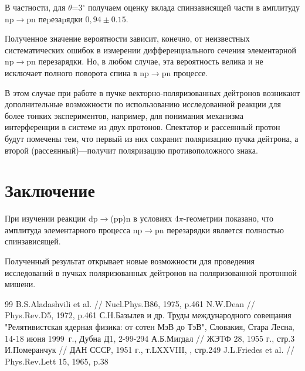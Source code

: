 \documentclass[a4paper,12pt]{article}
\begin{document}
В частности, для $\theta$=3$^\circ$ получаем оценку вклада спинзависящей части в
амплитуду np$\to$pn пеpезаpядки $0,94 \pm 0.15$.

Полученное значение вероятности зависит, конечно, от неизвестных систематических
ошибок в измерении дифференциального сечения элементарной np$\to$pn
перезарядки. Но, в любом случае, эта вероятность велика и не исключает полного
поворота спина в np$\to$pn процессе.

В этом случае при работе в пучке векторно-поляризованных дейтронов возникают
дополнительные возможности по использованию исследованной реакции для более
тонких экспериментов, например, для понимания механизма интерференции в системе
из двух протонов. Спектатор и рассеянный протон будут помечены тем, что первый
из них сохранит поляризацию пучка дейтрона, а второй (рассеянный)---получит
поляризацию противоположного знака.

\section{Заключение}
При изучении реакции dp$\to$(pp)n в условиях 4$\pi$-геометрии показано, что
амплитуда элементарного процесса np$\to$pn перезарядки является полностью
спинзависящей.

Полученный результат открывает новые возможности для проведения исследований в
пучках поляризованных дейтронов на поляризованной протонной мишени.

\begin {thebibliography}{99}
 B.S.Aladashvili et al. // Nucl.Phys.B86, 1975, p.461
 N.W.Dean // Phys.Rev.D5, 1972, p.461
 С.Н.Базылев и др. Труды международного совещания "Релятивистская
  ядерная физика: от сотен МэВ до ТэВ", Словакия, Стара Лесна, 14-18 июня
  1999~г., Дубна Д1, 2-99-294
 А.Б.Мигдал // ЖЭТФ 28, 1955 г., стр.3
 И.Померанчук // ДАН СССР, 1951 г., т.LXXVIII, ,
  стр.249
 J.L.Friedes et al. // Phys.Rev.Lett 15, 1965, p.38
\end{thebibliography}
\end{document}
